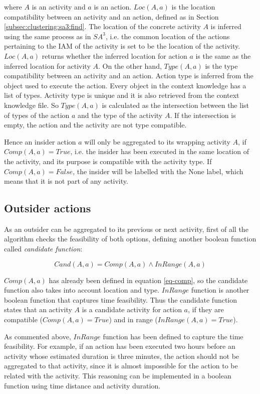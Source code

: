 \noindent where $A$ is an activity and $a$ is an action. $Loc(A, a)$ is the location compatibility between an activity and an action, defined as in Section \ref{subsec:clustering:sa3:find}. The location of the concrete activity $A$ is inferred using the same process as in $SA^3$, i.e. the common location of the actions pertaining to the IAM of the activity is set to be the location of the activity. $Loc(A, a)$ returns whether the inferred location for action $a$ is the same as the inferred location for activity $A$. On the other hand, $Type(A, a)$ is the type compatibility between an activity and an action. Action type is inferred from the object used to execute the action. Every object in the context knowledge has a list of types. Activity type is unique and it is also retrieved from the context knowledge file. So $Type(A, a)$ is calculated as the intersection between the list of types of the action $a$ and the type of the activity $A$. If the intersection is empty, the action and the activity are not type compatible.

Hence an insider action $a$ will only be aggregated to its wrapping activity $A$, if $Comp(A, a) = True$, i.e. the insider has been executed in the same location of the activity, and its purpose is compatible with the activity type. If $Comp(A, a) = False$, the insider will be labelled with the None label, which means that it is not part of any activity.

\subsection{Outsider actions}
As an outsider can be aggregated to its previous or next activity, first of all the algorithm checks the feasibility of both options, defining another boolean function called \textit{candidate function}:

\begin{equation}
\label{eq-candidate}
 Cand(A, a) = Comp(A, a) \wedge InRange(A, a)
\end{equation}

\noindent $Comp(A, a)$ has already been defined in equation \ref{eq-comp}, so the candidate function also takes into account location and type. $InRange$ function is another boolean function that captures time feasibility. Thus the candidate function states that an activity $A$ is a candidate activity for action $a$, if they are compatible ($Comp(A, a) = True$) and in range ($InRange(A, a) = True$). 

As commented above, $InRange$ function has been defined to capture the time feasibility. For example, if an action has been executed two hours before an activity whose estimated duration is three minutes, the action should not be aggregated to that activity, since it is almost impossible for the action to be related with the activity. This reasoning can be implemented in a boolean function using time distance and activity duration.

